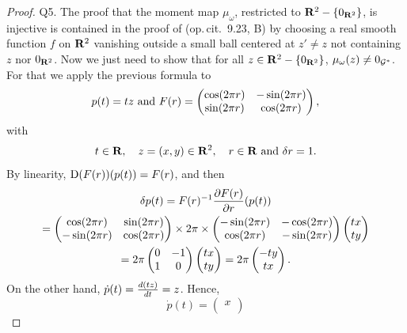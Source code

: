 \begin{proof}
  Q5. The proof that the moment map $\mu_\omega$,
   restricted to $\RR^2 - \{0_{\RR^2}\}$,
    is injective is contained in the proof of (op.\,cit. \textsection\,9.23, B) by choosing a real smooth function $f$ on $\RR^2$ vanishing outside a small ball centered at $z' \neq z$ not containing $z$ nor $0_{\RR^2}$.
    Now we just need to show that for all $z \in \RR^2 - \{0_{\RR^2}\}$, $\mu_\omega(z) \neq 0_{\cG^*}$.
  For that we apply the previous formula to
  $$
    p(t) = tz \SpacedText{and} F(r) =
    \begin{pmatrix} 
    \cos(2\pi r) & -\sin(2\pi r) \\
    \sin(2\pi r) & \cos(2\pi r) 
    \end{pmatrix},
    $$
  with
  $$
    t \in \RR, \quad z=(x,y)  \in \RR^2, \quad r \in \RR \SpacedText{and} \delta r = 1.
    $$
  By linearity, $\Der(F(r))(p(t)) = F(r)$,    
  and then
  \begin{multline*}
    \delta p(t) = F(r)^{-1}{\partial F(r) \over \partial r} (p(t)) \\
    =
    \begin{pmatrix} 
      \cos(2\pi r) & \sin(2\pi r) \\
      -\sin(2\pi r) & \cos(2\pi r) 
    \end{pmatrix}
    \times 2\pi \times 
    \begin{pmatrix} 
      -\sin(2\pi r) & -\cos(2\pi r) \\
      \cos(2\pi r) & -\sin(2\pi r) 
    \end{pmatrix}
    \begin{pmatrix} 
      tx \\
      ty
    \end{pmatrix}\\
    =
    2\pi
    \begin{pmatrix} 
      0 & -1 \\
      1 & 0 
    \end{pmatrix}
    \begin{pmatrix} 
      tx \\
      ty
    \end{pmatrix}
    =
    2\pi
    \begin{pmatrix} 
      -ty \\
      tx
    \end{pmatrix}.
  \end{multline*}
  On the other hand,
  $\dot p(t) = {d(tz) \over dt} = z$.
  Hence,
  $$
    \dot p(t) = \begin{pmatrix} 
    x \\

\end{pmatrix}$$
\end{proof}
